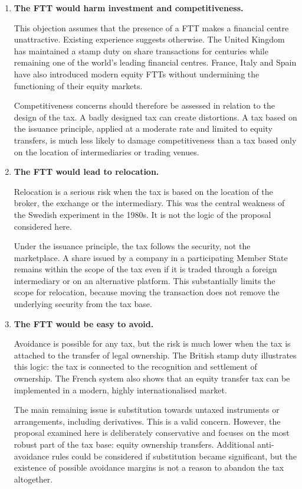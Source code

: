\documentclass[../../main]{subfiles}
\begin{document}
\begin{enumerate}
    \item \textbf{The FTT would harm investment and competitiveness.}

    This objection assumes that the presence of a FTT makes a financial centre unattractive. Existing experience suggests otherwise. The United Kingdom has maintained a stamp duty on share transactions for centuries while remaining one of the world's leading financial centres. France, Italy and Spain have also introduced modern equity FTTs without undermining the functioning of their equity markets.

    Competitiveness concerns should therefore be assessed in relation to the design of the tax. A badly designed tax can create distortions. A tax based on the issuance principle, applied at a moderate rate and limited to equity transfers, is much less likely to damage competitiveness than a tax based only on the location of intermediaries or trading venues.

    \item \textbf{The FTT would lead to relocation.}

    Relocation is a serious risk when the tax is based on the location of the broker, the exchange or the intermediary. This was the central weakness of the Swedish experiment in the 1980s. It is not the logic of the proposal considered here.

    Under the issuance principle, the tax follows the security, not the marketplace. A share issued by a company in a participating Member State remains within the scope of the tax even if it is traded through a foreign intermediary or on an alternative platform. This substantially limits the scope for relocation, because moving the transaction does not remove the underlying security from the tax base.

    \item \textbf{The FTT would be easy to avoid.}

    Avoidance is possible for any tax, but the risk is much lower when the tax is attached to the transfer of legal ownership. The British stamp duty illustrates this logic: the tax is connected to the recognition and settlement of ownership. The French system also shows that an equity transfer tax can be implemented in a modern, highly internationalised market.

    The main remaining issue is substitution towards untaxed instruments or arrangements, including derivatives. This is a valid concern. However, the proposal examined here is deliberately conservative and focuses on the most robust part of the tax base: equity ownership transfers. Additional anti-avoidance rules could be considered if substitution became significant, but the existence of possible avoidance margins is not a reason to abandon the tax altogether.


\end{enumerate}
\end{document}

